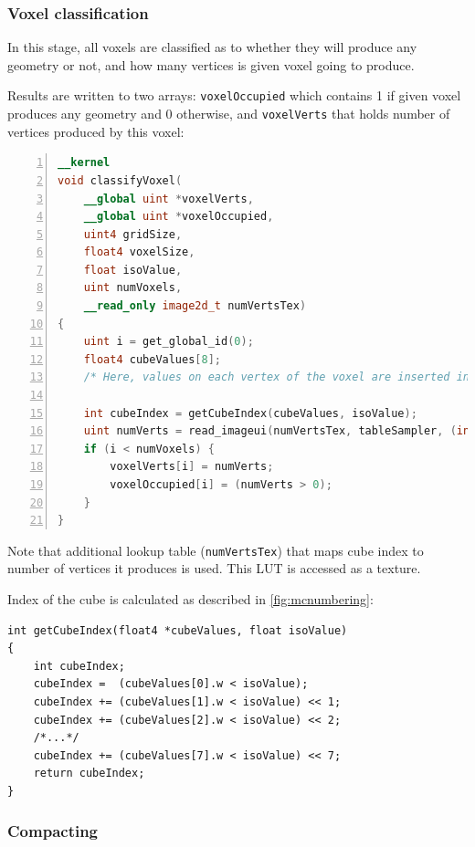 \subsubsection{Voxel classification}

In this stage, all voxels are classified as to whether they will produce any
geometry or not, and how many vertices is given voxel going to produce.

Results are written to two arrays: \texttt{voxelOccupied} which contains 1
if given voxel produces any geometry and 0 otherwise, and
\texttt{voxelVerts} that holds number of vertices produced by this voxel:
\begin{lstlisting}[language=opencl, numbers=left]
__kernel
void classifyVoxel(
	__global uint *voxelVerts,
	__global uint *voxelOccupied,
	uint4 gridSize,
	float4 voxelSize,
	float isoValue,
	uint numVoxels,
	__read_only image2d_t numVertsTex)
{
	uint i = get_global_id(0);
	float4 cubeValues[8];
	/* Here, values on each vertex of the voxel are inserted into cubeValues array */

	int cubeIndex = getCubeIndex(cubeValues, isoValue);
	uint numVerts = read_imageui(numVertsTex, tableSampler, (int2)(cubeIndex, 0)).x;
	if (i < numVoxels) {
		voxelVerts[i] = numVerts;
		voxelOccupied[i] = (numVerts > 0);
	}
}
\end{lstlisting}
Note that additional lookup table (\texttt{numVertsTex}) that maps cube index to
number of vertices it produces is used. This LUT is accessed as a texture.

Index of the cube is calculated as described in \autoref{fig:mcnumbering}:

\begin{lstlisting}
int getCubeIndex(float4 *cubeValues, float isoValue)
{
	int cubeIndex;
	cubeIndex =  (cubeValues[0].w < isoValue);
	cubeIndex += (cubeValues[1].w < isoValue) << 1;
	cubeIndex += (cubeValues[2].w < isoValue) << 2;
	/*...*/
	cubeIndex += (cubeValues[7].w < isoValue) << 7;
	return cubeIndex;
}
\end{lstlisting}

\subsubsection{Compacting}

